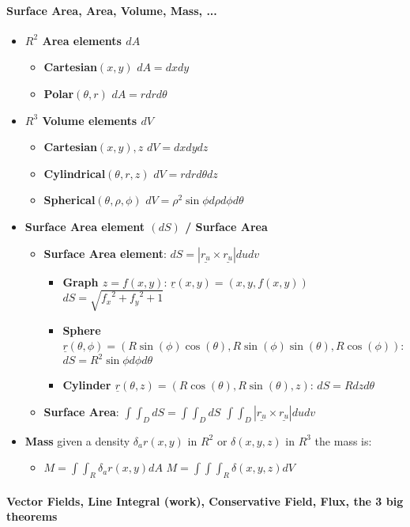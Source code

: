 \documentclass[8pt, twocolumn]{article}
\begin{document}
\paragraph{Surface Area, Area, Volume, Mass, ...}
\begin{itemize}
	\item \textbf{$R^2$ Area elements $d{A}$}
		\begin{itemize}
			\item \textbf{Cartesian$(x, y)$} $dA = dx dy$
			\item \textbf{Polar$(\theta, r)$} $dA = r dr d\theta$
		\end{itemize}
	\item \textbf{$R^3$ Volume elements $d{V}$}
		\begin{itemize}
			\item \textbf{Cartesian$(x, y), z$} $dV = dx dy dz$
			\item \textbf{Cylindrical$(\theta, r, z)$} $dV = r dr d\theta dz$			
			\item \textbf{Spherical$(\theta, \rho, \phi)$} $dV = \rho^2 \sin{\phi} d\rho d\phi d\theta$
		\end{itemize}	
	\item \textbf{Surface Area element $(dS)$ / Surface Area}
		\begin{itemize}

			\item \textbf{Surface Area element}: $dS = |\underline{r_u} \times \underline{r_u}| du dv$
				\begin{itemize}
					\item \textbf{Graph $z = f(x, y)$}: $\underline{r}(x, y) = (x, y, f(x, y))$ $dS = \sqrt{{f_x}^2 + {f_y}^2 + 1} $
					\item \textbf{Sphere $\underline{r}(\theta, \phi) = (R\sin(\phi)\cos(\theta), R\sin(\phi)\sin(\theta), R\cos(\phi))$}: $dS = R^2\sin{\phi}d\phi d\theta$
					\item \textbf{Cylinder $\underline{r}(\theta, z) = (R\cos(\theta), R\sin(\theta),z)$}: $dS = Rdz d\theta$
				\end{itemize}
			\item \textbf{Surface Area}: $\int\int_D{dS} = \int\int_D{dS}$  $\int\int_D{|\underline{r_u} \times \underline{r_u}| du dv} $
		\end{itemize}
	\item \textbf{Mass} given a density $\delta_ar(x, y)$ in  $R^2$ or $\delta(x, y, z)$ in $R^3$  the mass is: 
		\begin{itemize}
			\item $M = \int\int_R{\delta_ar(x, y)dA}$ $M = \int\int\int_R{\delta(x, y, z)dV}$
		\end{itemize}

\end{itemize}

\paragraph{Vector Fields, Line Integral (work), Conservative Field, Flux, the 3 big theorems}
\end{document}
